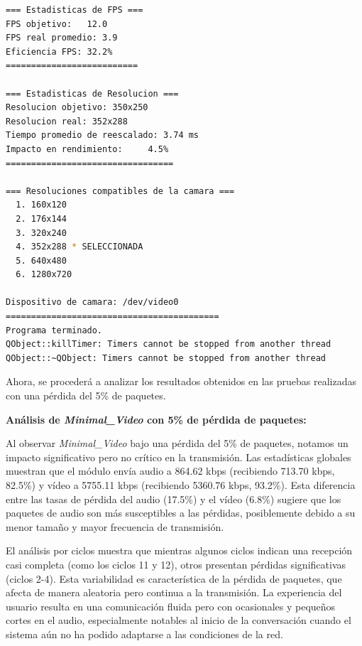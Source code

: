 \begin{lstlisting}[language=bash,basicstyle=\ttfamily\scriptsize]
=== Estadisticas de FPS ===
FPS objetivo: 	12.0
FPS real promedio: 3.9
Eficiencia FPS:	32.2%
==========================

=== Estadisticas de Resolucion ===
Resolucion objetivo: 350x250
Resolucion real: 352x288
Tiempo promedio de reescalado: 3.74 ms
Impacto en rendimiento:    	4.5%
=================================

=== Resoluciones compatibles de la camara ===
  1. 160x120
  2. 176x144
  3. 320x240
  4. 352x288 * SELECCIONADA
  5. 640x480
  6. 1280x720

Dispositivo de camara: /dev/video0
==========================================
Programa terminado.
QObject::killTimer: Timers cannot be stopped from another thread
QObject::~QObject: Timers cannot be stopped from another thread
\end{lstlisting}

\newpage

Ahora, se procederá a analizar los resultados obtenidos en las pruebas realizadas con una pérdida del 5\% de paquetes.
\vspace{\baselineskip}

\textbf{Análisis de \textit{Minimal\_Video} con 5\% de pérdida de paquetes:}
\vspace{\baselineskip}

Al observar \textit{Minimal\_Video} bajo una pérdida del 5\% de paquetes, notamos un impacto significativo pero no crítico en la transmisión. Las estadísticas globales muestran que el módulo envía audio a 864.62 kbps (recibiendo 713.70 kbps, 82.5\%) y vídeo a 5755.11 kbps (recibiendo 5360.76 kbps, 93.2\%). Esta diferencia entre las tasas de pérdida del audio (17.5\%) y el vídeo (6.8\%) sugiere que los paquetes de audio son más susceptibles a las pérdidas, posiblemente debido a su menor tamaño y mayor frecuencia de transmisión.
\vspace{\baselineskip}

El análisis por ciclos muestra que mientras algunos ciclos indican una recepción casi completa (como los ciclos 11 y 12), otros presentan pérdidas significativas (ciclos 2-4). Esta variabilidad es característica de la pérdida de paquetes, que afecta de manera aleatoria pero continua a la transmisión. La experiencia del usuario resulta en una comunicación fluida pero con ocasionales y pequeños cortes en el audio, especialmente notables al inicio de la conversación cuando el sistema aún no ha podido adaptarse a las condiciones de la red.

